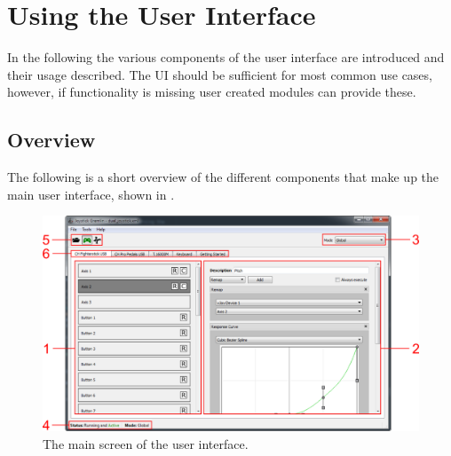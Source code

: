 \documentclass[a4, 10pt]{article}
\begin{document}
\section{Using the User Interface}
\label{sec:gui}

In the following the various components of the user interface are
introduced and their usage described. The UI should be sufficient for
most common use cases, however, if functionality is missing user created
modules can provide these.


\subsection{Overview}

The following is a short overview of the different components that make
up the main user interface, shown in .

\begin{figure}[bt]
    \centering

    \includegraphics[width=0.95\linewidth]{images/main_window}
    \caption{The main screen of the user interface.}
    \label{fig:main-ui}
\end{figure}
\end{document}
